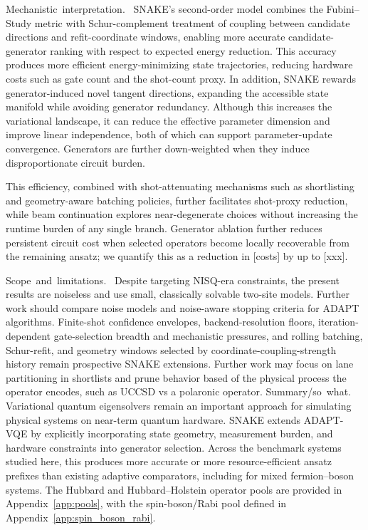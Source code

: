 \documentclass[
  reprint,
  amsmath,
  amssymb,
  aps,
  pra,
  nofootinbib,
  superscriptaddress,
  floatfix
]{revtex4-2}
\newcommand{\placeholder}[1]{\textcolor{red!70!black}{\ifmmode\left[#1\right]\else\textsf{[#1]}\fi}}
\newcommand{\tentative}[1]{\textcolor{red!70!black}{#1}}
\newcommand{\structlabel}[1]{\noindent\mbox{\tentative{#1.}}~}
\begin{document}
\structlabel{Mechanistic interpretation}
SNAKE's second-order model combines the Fubini--Study metric with Schur-complement treatment of coupling between candidate directions and refit-coordinate windows, enabling more accurate candidate-generator ranking with respect to expected energy reduction. This accuracy produces more efficient energy-minimizing state trajectories, reducing hardware costs such as gate count and the shot-count proxy. In addition, SNAKE rewards generator-induced novel tangent directions, expanding the accessible state manifold while avoiding generator redundancy. Although this increases the variational landscape, it can reduce the effective parameter dimension and improve linear independence, both of which can support parameter-update convergence. Generators are further down-weighted when they induce disproportionate circuit burden.

This efficiency, combined with shot-attenuating mechanisms such as shortlisting and geometry-aware batching policies, further facilitates shot-proxy reduction, while beam continuation explores near-degenerate choices without increasing the runtime burden of any single branch. Generator ablation further reduces persistent circuit cost when selected operators become locally recoverable from the remaining ansatz; we quantify this as a reduction in \placeholder{costs} by up to \placeholder{xxx}.

\structlabel{Scope and limitations}
Despite targeting NISQ-era constraints, the present results are noiseless and use small, classically solvable two-site models. Further work should compare noise models and noise-aware stopping criteria for ADAPT algorithms. Finite-shot confidence envelopes, backend-resolution floors, iteration-dependent gate-selection breadth and mechanistic pressures, and rolling batching, Schur-refit, and geometry windows selected by coordinate-coupling-strength history remain prospective SNAKE extensions. Further work may focus on lane partitioning in shortlists and prune behavior based of the physical process the operator encodes, such as UCCSD vs a polaronic operator.
\structlabel{Summary/so what}
Variational quantum eigensolvers remain an important approach for simulating physical systems on near-term quantum hardware. SNAKE extends ADAPT-VQE by explicitly incorporating state geometry, measurement burden, and hardware constraints into generator selection. Across the benchmark systems studied here, this produces more accurate or more resource-efficient ansatz prefixes than existing adaptive comparators, including for mixed fermion--boson systems. The Hubbard and Hubbard--Holstein operator pools are provided in Appendix~\ref{app:pools}, with the spin-boson/Rabi pool defined in Appendix~\ref{app:spin_boson_rabi}.
\end{document}
